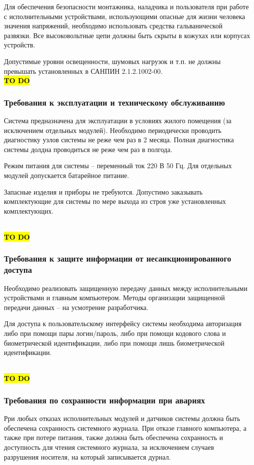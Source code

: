 \documentclass[a4paper, 12pt, titlepage]{article}
\begin{document}
Для обеспечения безопасности монтажника, наладчика и пользователя при работе с исполнительными устройствами, использующими 
опасные для жизни человека значения напряжений, необходимо использовать средства гальванической развязки. Все высоковольтные цепи 
должны быть скрыты в кожухах или корпусах устройств.

Допустимые уровни освещенности, шумовых нагрузок и т.п. не должны превышать установленных в САНПИН 2.1.2.1002-00.
\\
\hl{\bf TO DO}
\subsubsection{Требования к эксплуатации и техническому обслуживанию}

Система предназначена для эксплуатации в условиях жилого помещения (за исключением отдельных модулей). 
Необходимо периодически проводить диагностику узлов системы не реже чем раз в 2 месяца. Полная диагностика системы 
долдна проводиться не реже чем раз в полгода.

Режим питания для системы -- переменный ток 220 В 50 Гц. Для отдельных модулей допускается батарейное питание.

Запасные изделия и приборы не требуются. Допустимо заказывать комплектующие для системы по мере выхода из строя 
уже установленных комплектующих.

\\
\hl{\bf TO DO}
\subsubsection{Требования к защите информации от несанкционированного доступа}

Необходимо реализовать защищенную передачу данных между исполнительными устройствами и главным компьютером. 
Методы организации защищенной передачи данных -- на усмотрение разработчика.

Для доступа к пользовательскому интерфейсу системы необходима авторизация либо при помощи пары логин/пароль, 
либо при помощи кодового слова и биометрической идентификации, либо при помощи лишь биометрической идентификации.

\\
\hl{\bf TO DO}
\subsubsection{Требования по сохранности информации при авариях}

Рри любых отказах исполнительных модулей и датчиков системы должна быть обеспечена сохранность системного журнала. 
При отказе главного компьютера, а также при потере питания, также должна быть обеспечена сохранность и доступность для 
чтения системного журнала, за исключением случаев разрушения носителя, на который записывается дурнал.
\end{document}
